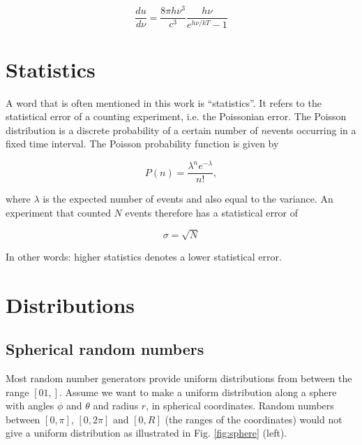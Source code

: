 \begin{appendices}
\begin{equation}
\frac{du}{d\nu} = \frac{8\pi h \nu^3}{c^3} \frac{h\nu}{e^{h\nu/kT} - 1}
\end{equation}

\chapter{Statistics}
A word that is often mentioned in this work is ``statistics''. It refers to the statistical error of a counting experiment, i.e. the Poissonian error. The Poisson distribution is a discrete probability of a certain number of $n$events occurring in a fixed time interval. The Poisson probability function is given by

\begin{equation}
P(n) = \frac{\lambda^n e^{-\lambda}}{n!},
\end{equation}

\noindent where $\lambda$ is the expected number of events and also equal to the variance. An experiment that counted $N$ events therefore has a statistical error of

\begin{equation}
\sigma = \sqrt{N}
\end{equation}

\noindent In other words: higher statistics denotes a lower statistical error.

\chapter{Distributions}
\label{ch:distributions}

\section{Spherical random numbers}
\label{sec:sphericalrandom}
Most random number generators provide uniform distributions from between the range $[01,]$. Assume we want to make a uniform distribution along a sphere with angles $\phi$ and $\theta$ and radius $r$, in spherical coordinates. Random numbers between $[0,\pi]$, $[0,2\pi]$ and $[0,R]$ (the ranges of the coordinates) would not give a uniform distribution as illustrated in Fig. \ref{fig:sphere} (left).


\end{appendices}
